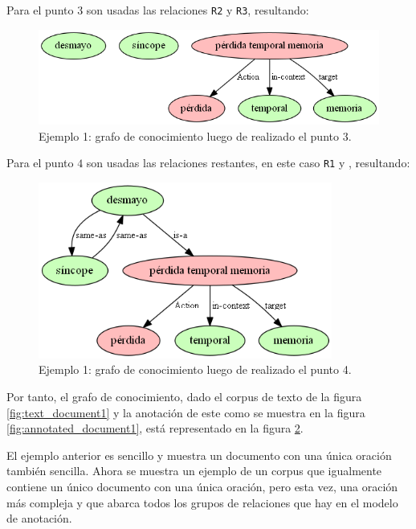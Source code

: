 Para el punto $3$ son usadas las relaciones \texttt{R2} y \texttt{R3}, resultando:
\begin{figure}[H]
	\begin{center}
		\includegraphics[width=5in]{graphics/knowledge_graph_example1_2.png}
		\caption[Ejemplo 1: grafo de conocimiento luego de realizado el punto 3]{Ejemplo 1: grafo de conocimiento luego de realizado el punto 3.}
		\label{fig:knowledge_graph1.2}
	\end{center}
\end{figure}

Para el punto $4$ son usadas las relaciones restantes, en este caso \texttt{R1} y \texttt{\textasteriskcentered}, resultando:
\begin{figure}[H]
	\begin{center}
		\includegraphics[width=3.8in]{graphics/knowledge_graph_example1_3.png}
		\caption[Ejemplo 1: grafo de conocimiento luego de realizado el punto 4]{Ejemplo 1: grafo de conocimiento luego de realizado el punto 4.}
		\label{fig:knowledge_graph1.3}
	\end{center}
\end{figure}

Por tanto, el grafo de conocimiento, dado el corpus de texto de la figura \ref{fig:text_document1} y la anotación de este como se muestra en la figura \ref{fig:annotated_document1}, está representado en la figura \ref{fig:knowledge_graph1.3}.

El ejemplo anterior es sencillo y muestra un documento con una única oración también sencilla. Ahora se muestra un ejemplo de un corpus que igualmente contiene un único documento con una única oración, pero esta vez, una oración más compleja y que abarca todos los grupos de relaciones que hay en el modelo de anotación.

